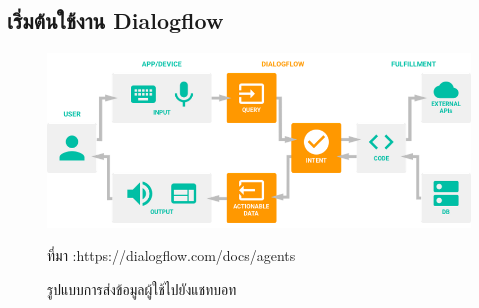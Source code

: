  \subsection{เริ่มต้นใช้งาน Dialogflow}
 \begin{figure}[H]
	\centering
	\includegraphics[width=0.7\columnwidth]{Figures/2/chatbot}
	\caption{รูปแบบการส่งข้อมูลผู้ใช้ไปยังแชทบอท}{ที่มา :https://dialogflow.com/docs/agents}
	\label{Fig:f1}
\end{figure}

